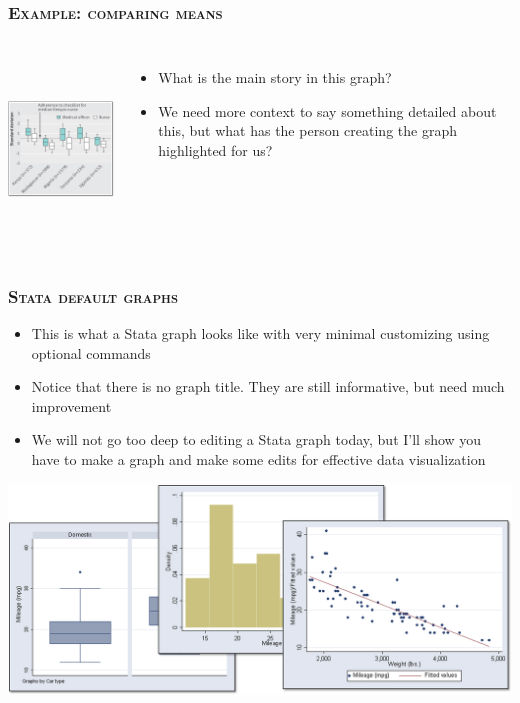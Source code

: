 \documentclass[10pt]{beamer}
\begin{document}
	\begin{frame}
	\frametitle{\textsc{Example: comparing means}}
		\begin{columns}
		\includegraphics[height=5cm, width=6cm]{figure_example_2}
		\hspace{5mm}
		\begin{itemize}
			\item What is the main story in this graph? 
			\item We need more context to say something detailed about this, 
				  but what has the person creating the graph highlighted for us?
		\end{itemize}
		\end{columns} 
	\end{frame}
	
	
	\begin{frame}
	\frametitle{\textsc{Stata default graphs}}
		\begin{itemize}
			\item This is what a Stata graph looks like with very minimal 
				  customizing using optional commands
			\item Notice that there is no graph title. 
				  They are still informative, but need much improvement
			\item We will not go too deep to editing a Stata graph today,
				  but I'll show you have to make a graph and make some edits
				  for effective data visualization
		\end{itemize}	
		\begin{center}
			\includegraphics[width=\linewidth]{figure_example_3}
		\end{center}
	\end{frame}
\end{document}
